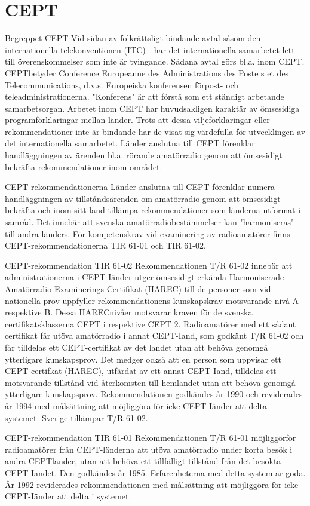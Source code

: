 \section{CEPT}
Begreppet CEPT
Vid sidan av folkrättsligt bindande avtal såsom den internationella telekonventionen
(ITC) - har det internationella samarbetet
lett till överenskommelser som inte är tvingande. Sådana avtal görs bl.a. inom CEPT.
CEPTbetyder Conference Europeanne des
Administrations des Poste s et des Telecommunications, d.v.s. Europeiska konferensen
förpost- och teleadministrationerna. "Konferens" är att förstå som ett ständigt arbetande
samarbetsorgan.
Arbetet inom CEPT har huvudsakligen
karaktär av ömsesidiga programförklaringar
mellan länder. Trots att dessa viljeförklaringar
eller rekommendationer inte är bindande har
de visat sig värdefulla för utvecklingen av det
internationella samarbetet.
Länder anslutna till CEPT förenklar handläggningen av ärenden bl.a. rörande amatörradio genom att ömsesidigt bekräfta
rekommendationer inom området.

CEPT-rekommendationerna
Länder anslutna till CEPT förenklar numera
handläggningen av tillståndsärenden om
amatörradio genom att ömsesidigt bekräfta
och inom sitt land tillämpa rekommendationer som länderna utformat i samråd. Det
innebär att svenska amatörradiobestämmelser kan "harmoniseras" till andra länders.
För kompetenskrav vid examinering av radioamatörer finns CEPT-rekommendationerna TIR 61-01 och TIR 61-02.

CEPT-rekommendation TIR 61-02
Rekommendationen T/R 61-02 innebär att
administrationerna i CEPT-Iänder utger ömsesidigt erkända Harmoniserade Amatörradio Examinerings Certifikat (HAREC) till de
personer som vid nationella prov uppfyller
rekommendationens kunskapskrav motsvarande nivå A respektive B. Dessa HARECnivåer motsvarar kraven för de svenska certifikatsklasserna CEPT i respektive CEPT
2. Radioamatörer med ett sådant certifikat
får utöva amatörradio i annat CEPT-Iand,
som godkänt T/R 61-02 och får tilldelas ett
CEPT-certifikat av det landet utan att behöva genomgå ytterligare kunskapsprov.
Det medger också att en person som
uppvisar ett CEPT-certifkat (HAREC), utfärdat av ett annat CEPT-Iand, tilldelas ett
motsvarande tillstånd vid återkomsten till
hemlandet utan att behöva genomgå ytterligare kunskapsprov.
Rekommendationen godkändes år 1990
och reviderades år 1994 med målsättning
att möjliggöra för icke CEPT-Iänder att delta
i systemet.
Sverige tillämpar T/R 61-02.

CEPT-rekommendation TIR 61-01
Rekommendationen T/R 61-01 möjliggörför
radioamatörer från CEPT-länderna att utöva
amatörradio under korta besök i andra CEPTländer, utan att behöva ett tillfälligt tillstånd
från det besökta CEPT-Iandet. Den godkändes år 1985. Erfarenheterna med detta system är goda. År 1992 reviderades rekommendationen med målsättning att möjliggöra för icke CEPT-Iänder att delta i systemet.

